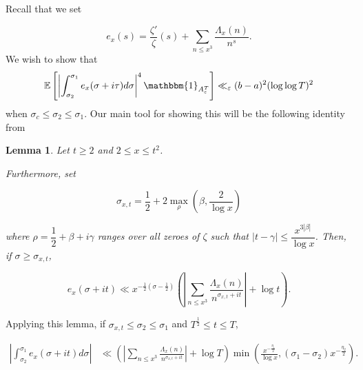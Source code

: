 \documentclass{article}
\newcommand{\1}{\mathds{1}}
\numberwithin{equation}{section}
\newcommand{\eps}{\varepsilon}
\renewcommand{\leq}{\leqslant}
\renewcommand{\geq}{\geqslant}
\newcommand{\E}{\mathbb{E}}
\theoremstyle{plain} %
\newtheorem{lemma}[theorem]{Lemma}
\newcommand{\Hf}{\dfrac{1}{2}}
\newcommand{\hf}{\frac{1}{2}}
\begin{document}
Recall that we set

\begin{equation}
    e_x(s) = \frac{\zeta'}{\zeta}(s) + \sum_{n \leq x^3} \frac{\Lambda_x(n)}{n^s}.
\end{equation}
We wish to show that
\begin{equation}
    \label{toshow}
   \E \left[\left|\int_{\sigma_2}^{\sigma_1}e_x(\sigma + i \tau) d \sigma \right|^4\mathbbm{1}_{A_\eps^T}\right] \ll_\eps (b-a)^2(\log \log T)^2
\end{equation}
when $\sigma_c \leq \sigma_2 \leq \sigma_1$. Our main tool for showing this will be the following identity from \cite[equation (4.9)]{Sel1946}

\begin{lemma}
\label{selblem}
    Let $t \geq 2$ and $2 \leq x \leq t^2$.

Furthermore, set

$$\sigma_{x, t} = \Hf + 2 \max_\rho (\beta , \frac{2}{\log x})$$

where $\rho = \Hf + \beta + i \gamma$ ranges over all zeroes of $\zeta$ such that $|t - \gamma| \leq \dfrac{x^{3|\beta|}}{\log x}$.
Then, if $\sigma \geq \sigma_{x, t}$,

\begin{equation}
    e_x(\sigma + i t) \ll  x^{- \frac{1}{2}(\sigma - \hf)}  \left( \left| \sum_{n \leq x^3} \frac{\Lambda_x(n)}{n^{\sigma_{x, t} + it}} \right| + \log t \right).
\end{equation}

\end{lemma}

Applying this lemma, if $\sigma_{x, t} \leq \sigma_2 \leq \sigma_1$ and $T^{\frac{1}{2}} \leq t \leq T$,

\begin{equation}
    \begin{split}
        \left|\int_{\sigma_2}^{\sigma_1}e_x(\sigma + i t) d \sigma \right| 
        & \ll \left( \left|\sum_{n \leq x^3} \frac{\Lambda_x(n)}{n^{ \sigma_{x, t} + it}} \right| + \log T  \right) \min(\frac{x^{-\frac{\eta_1}{2}}}{\log x}, (\sigma_1 - \sigma_2) x^{-\frac{\eta_2}{2}}).
    \end{split}
\end{equation}
\end{document}
